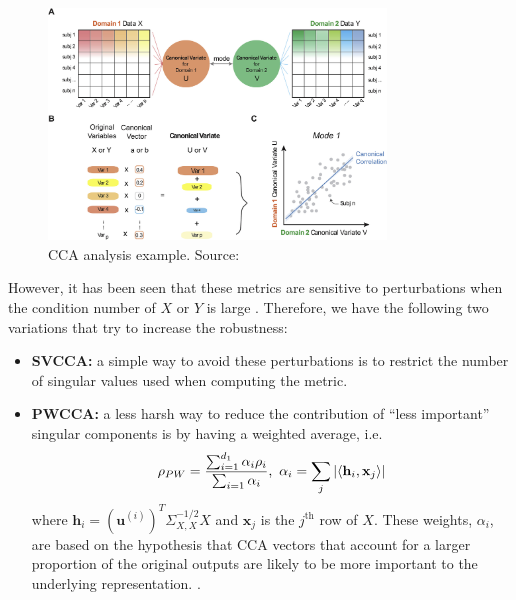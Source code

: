 \documentclass[../main.tex]{subfiles}
\begin{document}
\begin{itemize}
    \begin{figure}[!ht]
        \centering
        \includegraphics[width=0.8\textwidth]{figures/bg/ccaScheme.jpg} 
        \caption{CCA analysis example. Source: \cite{wang_finding_2020}}
        \label{fig:ccaScheme}
    \end{figure}    

    However, it has been seen that these metrics are sensitive to perturbations when the condition number of $X$ or $Y$ is large \cite{kornblith_similarity_2019}. Therefore, we have the following two variations that try to increase the robustness:
    \begin{itemize}
        \item \textbf{SVCCA:} a simple way to avoid these perturbations is to restrict the number of singular values used when computing the metric.
        \item \textbf{PWCCA:} a less harsh way to reduce the contribution of ``less important'' singular components is by having a weighted average, i.e.
        \[
        \rho_{PW} = \frac{\sum_{i=1}^{d_1}\alpha_i \rho_i}{\sum_{i=1}\alpha_i},\ \alpha_i = \sum_j \left\lvert \langle 
\mathbf{h}_i, \mathbf{x}_j \rangle \right\rvert
        \]
        where $\mathbf{h}_i = (\mathbf{u}^{(i)})^T\Sigma_{X, X}^{-1/2}X $ and $\mathbf{x}_j$ is the $j^{\text{th}}$ row of $X$. These weights, $\alpha_i$, are based on the hypothesis that CCA vectors that account for a larger proportion of the original outputs are likely to be more important to the underlying representation. \cite{morcos_insights_2018}.
    \end{itemize}


\end{itemize}
\end{document}
